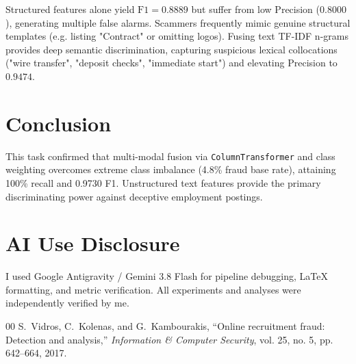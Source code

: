 \documentclass[10pt,journal,compsoc,twocolumn]{IEEEtran}
\begin{document}
Structured features alone yield $\text{F1} = 0.8889$ but suffer from low Precision ($0.8000$), generating multiple false alarms. Scammers frequently mimic genuine structural templates (e.g. listing "Contract" or omitting logos). Fusing text TF-IDF n-grams provides deep semantic discrimination, capturing suspicious lexical collocations ("wire transfer", "deposit checks", "immediate start") and elevating Precision to $0.9474$.

\section{Conclusion}
This task confirmed that multi-modal fusion via \texttt{ColumnTransformer} and class weighting overcomes extreme class imbalance (4.8\% fraud base rate), attaining 100\% recall and 0.9730 F1. Unstructured text features provide the primary discriminating power against deceptive employment postings.

\section*{AI Use Disclosure}
I used Google Antigravity / Gemini 3.8 Flash for pipeline debugging, LaTeX formatting, and metric verification. All experiments and analyses were independently verified by me.

\begin{thebibliography}{00}
S.~Vidros, C.~Kolenas, and G.~Kambourakis, ``Online recruitment fraud: Detection and analysis,'' \textit{Information \& Computer Security}, vol. 25, no. 5, pp. 642--664, 2017.
\end{thebibliography}
\end{document}
